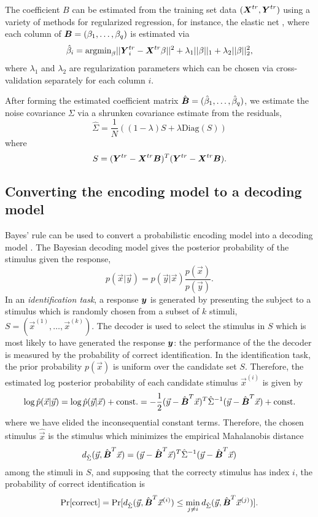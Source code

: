 \documentclass[12pt]{article}
\begin{document}
The coefficient $B$
can be estimated from the training set data $(\boldsymbol{X}^{tr}, \boldsymbol{Y}^{tr})$
using a variety of methods for regularized regression, for instance,
the elastic net \cite{Zou2005}, where each column of $\boldsymbol{B} =
(\beta_1,\hdots, \beta_q)$ is estimated via
\[
\hat{\beta}_i = \text{argmin}_\beta ||\boldsymbol{Y}_i^{tr} - \boldsymbol{X}^{tr} \beta||^2 + \lambda_1 ||\beta||_1 + \lambda_2 ||\beta||_2^2,
\]
where $\lambda_1$ and $\lambda_2$ are regularization parameters which
can be chosen via cross-validation \cite{Hastie2009a} separately for
each column $i$.

After forming the estimated coefficient matrix $\hat{\boldsymbol{B}} =
(\hat{\beta}_1,\hdots, \hat{\beta}_q)$, we estimate the noise
covariance $\Sigma$ via a shrunken covariance
estimate\cite{Ledoit2004}\cite{Daniels2001} from the residuals,
\[
\hat{\Sigma} = \frac{1}{N} ((1-\lambda) S + \lambda \text{Diag}(S)) 
\]
where
\[
S = (\boldsymbol{Y}^{tr} - \boldsymbol{X}^{tr} \boldsymbol{B})^T (\boldsymbol{Y}^{tr} - \boldsymbol{X}^{tr} \boldsymbol{B}).
\]

\subsection{Converting the encoding model to a decoding model}

Bayes' rule can be used to convert a probabilistic encoding model into a decoding model \cite{Naselaris2011}.
The Bayesian decoding model gives the posterior probability of the stimulus given the response,
\[
p(\vec{x}|\vec{y}) = p(\vec{y}|\vec{x})\frac{p(\vec{x})}{p(\vec{y})}.
\]
In an \emph{identification task}\cite{Kay2008a}, a response $\boldsymbol{y}$ is generated by presenting the subject to a stimulus which is randomly chosen from a 
subset of $k$ stimuli, $S = (\vec{x}^{(1)},\hdots, \vec{x}^{(k)})$.  The decoder is used to select the stimulus in $S$ which is most likely to have generated the response $\boldsymbol{y}$: the performance of the the decoder is measured by the probability of correct identification.
In the identification task, the prior probability $p(\vec{x})$ is uniform over the candidate set $S.$  Therefore, the estimated log posterior probability of each candidate stimulus $\vec{x}^{(i)}$ is given by
\[
\log \hat{p}(\vec{x}|\vec{y}) = \log \hat{p}(\vec{y}|\vec{x}) + \text{const.}= -\frac{1}{2}(\vec{y} - \hat{\boldsymbol{B}}^T \vec{x})^T \hat{\Sigma}^{-1} (\vec{y}-\hat{\boldsymbol{B}}^T \vec{x}) + \text{const.}
\]
where we have elided the inconsequential constant terms.
Therefore, the chosen stimulus $\hat{\vec{x}}$ is the stimulus which minimizes the empirical Mahalanobis distance 
\[
d_{\hat{\Sigma}}(\vec{y}, \hat{\boldsymbol{B}}^T \vec{x}) = (\vec{y} - \hat{\boldsymbol{B}}^T \vec{x})^T \hat{\Sigma}^{-1} (\vec{y}-\hat{\boldsymbol{B}}^T \vec{x})
\]
among the stimuli in $S$,
and supposing that the correcty stimulus has index $i$, the probability of correct identification is
\[
\Pr[\text{correct}] = \Pr[d_{\hat{\Sigma}}(\vec{y}, \hat{\boldsymbol{B}}^T \vec{x}^{(i)}) \leq \min_{j \neq i} d_{\hat{\Sigma}}(\vec{y}, \hat{\boldsymbol{B}}^T \vec{x}^{(j)}) ].
\]
\end{document}
